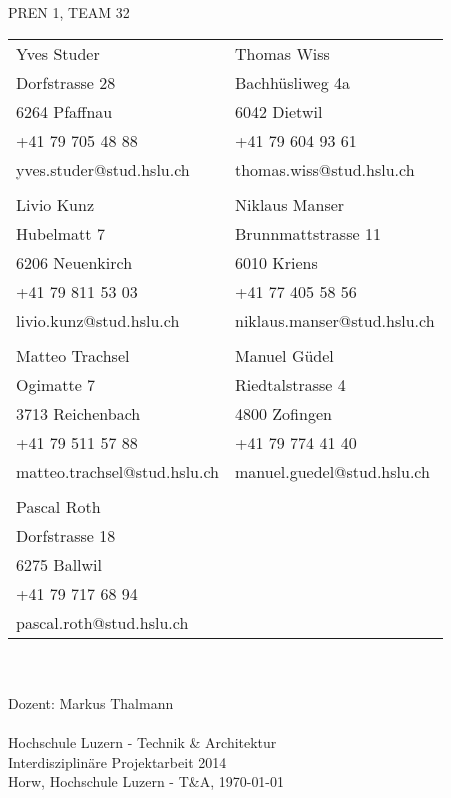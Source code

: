 \begin{titlepage}
    \parindent0pt {\Huge PREN 1, TEAM 32}\\
    \vspace*{0.7cm}
    \newline
    \begin{tabular}{ p{6cm} p{5cm}}
        Yves Studer                & Thomas Wiss \\
        Dorfstrasse 28             & Bachhüsliweg 4a \\
        6264 Pfaffnau              & 6042 Dietwil \\
        +41 79 705 48 88           & +41 79 604 93 61 \\
        yves.studer@stud.hslu.ch   & thomas.wiss@stud.hslu.ch \\
                                   & \\
        Livio Kunz                 & Niklaus Manser \\
        Hubelmatt 7                & Brunnmattstrasse 11\\
        6206 Neuenkirch            & 6010 Kriens \\
        +41 79 811 53 03           & +41 77 405 58 56 \\
        livio.kunz@stud.hslu.ch    & niklaus.manser@stud.hslu.ch \\
                                   & \\
        Matteo Trachsel			   & Manuel Güdel \\
        Ogimatte 7                 & Riedtalstrasse 4\\
        3713 Reichenbach           & 4800 Zofingen\\
        +41 79 511 57 88           & +41 79 774 41 40 \\
        matteo.trachsel@stud.hslu.ch & manuel.guedel@stud.hslu.ch \\
        						   & \\
        Pascal Roth			       & \\
        Dorfstrasse 18			   & \\
        6275 Ballwil		       & \\
        +41 79 717 68 94	       & \\
        pascal.roth@stud.hslu.ch   & \\
    \end{tabular}
    \vspace*{1.7cm}
    \newline
    {\Huge \myTitel}\\
    \vspace*{1.2cm}\\
    {\normalsize Dozent: Markus Thalmann}\\
    \vspace*{0.2cm}\\
    {\normalsize Hochschule Luzern - Technik \& Architektur}\\
    {\normalsize Interdisziplinäre Projektarbeit 2014}\\
    \vspace*{2.3cm}
    \newline
    {\normalsize Horw, Hochschule Luzern - T\&A, \today}\\
\end{titlepage}
